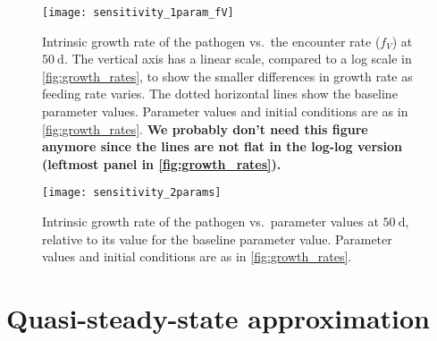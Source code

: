 \documentclass{article}
\newcommand{\comment}[1]{\textbf{#1}}
\begin{document}
\begin{figure}
  \centering
  \texttt{[image: sensitivity\_1param\_fV]}
  \caption{Intrinsic growth rate of the pathogen vs.~the encounter
    rate ($f_V$) at $50~\text{d}$.  The vertical axis has a linear scale,
    compared to a log scale in \autoref{fig:growth_rates}, to show the
    smaller differences in growth rate as feeding rate varies.  The
    dotted horizontal lines show the baseline parameter values.
    Parameter values and initial conditions are as in
    \autoref{fig:growth_rates}.  \comment{We probably don't need this
      figure anymore since the lines are not flat in the log-log
      version (leftmost panel in \autoref{fig:growth_rates}).}}
  \label{fig:sensitivity_1param_fV}
\end{figure}

\begin{figure}
  \centering
  \texttt{[image: sensitivity\_2params]}
  \caption{Intrinsic growth rate of the pathogen vs.~parameter values
    at $50~\text{d}$, relative to its value for the baseline
    parameter value.  Parameter values and
    initial conditions are as in \autoref{fig:growth_rates}.}
  \label{fig:sensitivity_2params}
\end{figure}


\clearpage
\appendix
\section{Quasi-steady-state approximation}
\label{sec:QSSA}
\end{document}
